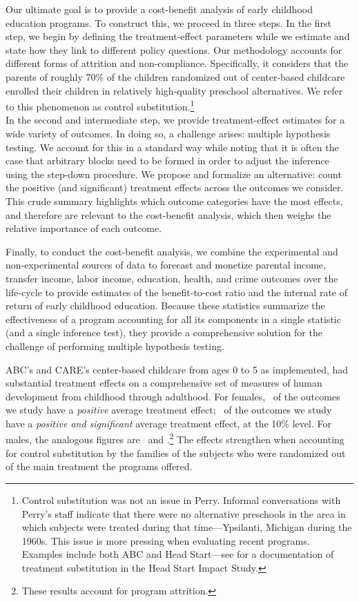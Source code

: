 Our ultimate goal is to provide a cost-benefit analysis of early childhood education programs. To construct this, we proceed in three steps. In the first step, we begin by defining the treatment-effect parameters while we estimate and state how they link to different policy questions. Our methodology accounts for different forms of attrition and non-compliance. Specifically, it considers that the parents of roughly 70\% of the children randomized out of center-based childcare enrolled their children in relatively high-quality preschool alternatives. We refer to this phenomenon as control substitution.\footnote{Control  substitution was not an issue in Perry. Informal conversations with Perry's staff indicate that there were no alternative preschools in the area in which subjects were treated during that time---Ypsilanti, Michigan during the 1960s. This issue is more pressing when evaluating recent programs. Examples include both ABC and Head Start---see \citep{Puma_Bell_etal_2010_HeadStartImpact} for a documentation of treatment substitution in the Head Start Impact Study.}\\

In the second and intermediate step, we provide treatment-effect estimates for a wide variety of outcomes. In doing so, a challenge arises: multiple hypothesis testing. We account for this in a standard way \citep{Lehman_Romano_2005_AnnStat,Romano_Shaikh_2006_AnnStat} while noting that it is often the case that arbitrary blocks need to be formed in order to adjust the inference using the step-down procedure. We propose and formalize an alternative: count the positive (and significant) treatment effects across the outcomes we consider. This crude summary highlights which outcome categories have the most effects, and therefore are relevant to the cost-benefit analysis, which then weighs the relative importance of each outcome.

Finally, to conduct the cost-benefit analysis, we combine the experimental and non-experimental sources of data to forecast and monetize parental income, transfer income, labor income, education, health, and crime outcomes over the life-cycle to provide estimates of the benefit-to-cost ratio and the internal rate of return of early childhood education. Because these statistics summarize the effectiveness of a program accounting for all its components in a single statistic (and a single inference test), they provide a comprehensive solution for the challenge of performing multiple hypothesis testing.

ABC's and CARE's center-based childcare from ages 0 to 5 as implemented, had substantial treatment effects on a comprehensive set of measures of human development from childhood through adulthood. For females, \positivef\ of the outcomes we study have a \textit{positive} average treatment effect; \positivesf\ of the outcomes we study have a \textit{positive and significant} average treatment effect, at the 10\% level. For males, the analogous figures are \positivem\ and \positivesm.\footnote{These results account for program attrition.} The effects strengthen when accounting for control substitution by the families of the subjects who were randomized out of the main treatment  the programs offered.

